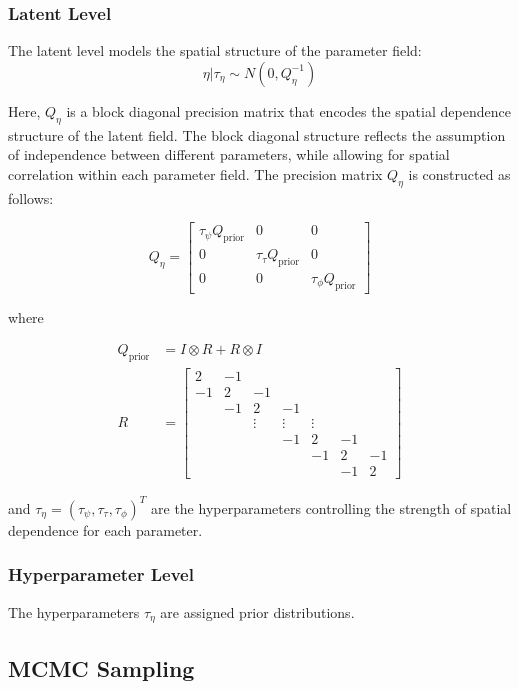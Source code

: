 \documentclass[
  letterpaper,
  DIV=11,
  numbers=noendperiod]{scrartcl}
\begin{document}
\subsubsection{Latent Level}\label{latent-level}

The latent level models the spatial structure of the parameter field: \[
\eta | \tau_\eta \sim N(0, Q_\eta^{-1})
\]

Here, \(Q_\eta\) is a block diagonal precision matrix that encodes the
spatial dependence structure of the latent field. The block diagonal
structure reflects the assumption of independence between different
parameters, while allowing for spatial correlation within each parameter
field. The precision matrix \(Q_\eta\) is constructed as follows:

\[
Q_\eta = \begin{bmatrix}
\tau_\psi Q_{\text{prior}} & 0 & 0 \\
0 & \tau_\tau Q_{\text{prior}} & 0 \\
0 & 0 & \tau_\phi Q_{\text{prior}}
\end{bmatrix}
\]

where

\[
\begin{aligned}
Q_{\text{prior}} &= I \otimes R + R \otimes I \\
R &= \begin{bmatrix}
2 & -1 \\
-1 & 2 & -1 \\
& -1 & 2 & -1 \\
& & \vdots & \vdots & \vdots \\
& & & -1 & 2 & -1 \\
& & & & -1 & 2 & -1 \\
& & & & & -1 & 2
\end{bmatrix}
\end{aligned}
\]

and \(\tau_\eta = \left(\tau_\psi, \tau_\tau, \tau_\phi\right)^T\) are
the hyperparameters controlling the strength of spatial dependence for
each parameter.

\subsubsection{Hyperparameter Level}\label{hyperparameter-level}

The hyperparameters \(\tau_\eta\) are assigned prior distributions.

\subsection{MCMC Sampling}\label{mcmc-sampling}
\end{document}
